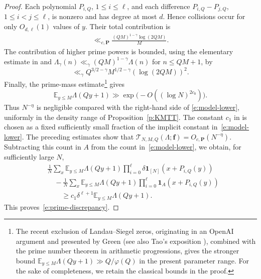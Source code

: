 \documentclass[12pt]{amsart}
\newcommand{\E}{\mathbb E}
\newcommand{\1}{\mathbf 1}
\begin{document}
\begin{proof}
Each polynomial $P_{i,Q}$, $1\leq i\leq\ell$, and each difference
$P_{i,Q}-P_{j,Q}$, $1\leq i<j\leq\ell$, is nonzero and has
degree at most $d$.
Hence collisions occur for only $O_{d,\ell}(1)$ values of $y$.
Their total contribution is
\begin{align}\label{e:collisionterms}
    \ll_{c,\mathbf P}\frac{(QM)^{1-\gamma}\log(2QM)}M.
\end{align}
The contribution of higher prime powers is bounded, using
the elementary estimate in \cite[(5.5)]{KMTT} and
$\Lambda_\gamma(n)\ll_\gamma(QM)^{1-\gamma}\Lambda(n)$
for $n\leq QM+1$, by
\begin{equation}\label{e:prime-powers}
 \ll_\gamma Q^{3/2-\gamma}M^{1/2-\gamma}
 (\log(2QM))^2.
\end{equation}
Finally, the prime-mass estimate\footnote{The recent exclusion of Landau--Siegel zeros,
originating in an OpenAI argument and presented by Green
\cite{GreenNoSiegel} (see also Tao's exposition
\cite{TaoNoSiegel}), combined with the prime number theorem
in arithmetic progressions, gives the stronger bound
$\E_{y\leq M}\Lambda(Qy+1)\gg Q/\varphi(Q)$
in the present parameter range. For the sake of completeness,
we retain the classical bounds in the proof.} \cite[(5.15)]{KMTT} gives
\begin{equation}\label{e:prime-mass}
 \E_{y\leq M}\Lambda(Qy+1)
 \gg\exp\bigl(-O((\log N)^{2c_0})\bigr).
\end{equation}
Thus $N^{-\eta}$ is negligible compared with the right-hand side of
\eqref{e:model-lower}, uniformly in the density range of
Proposition~\ref{p:KMTT}. The constant $c_1$ in
\cite[(5.11)]{KMTT} is chosen as a fixed sufficiently small fraction of
the implicit constant in~\eqref{e:model-lower}. The preceding estimates show that
$\mathcal T_{N,M,Q}(\Lambda;\mathbf f)
=O_{c,\mathbf P}(N^{-\eta})$.
Subtracting this count in $A$ from the  count
in~\eqref{e:model-lower}, we obtain, for sufficiently large $N$,
\begin{align*}
 &\frac1N\sum_x\E_{y\leq M}\Lambda(Qy+1)
 \prod_{i=0}^{\ell}\delta\1_{[N]}(x+P_{i,Q}(y))\\
 &\quad-\frac1N\sum_x\E_{y\leq M}\Lambda(Qy+1)
 \prod_{i=0}^{\ell}\1_A(x+P_{i,Q}(y))\\
 &\qquad\geq
 c_1\delta^{\ell+1}\E_{y\leq M}\Lambda(Qy+1).
\end{align*}
This proves~\eqref{e:prime-discrepancy}.
\end{proof}
\end{document}
